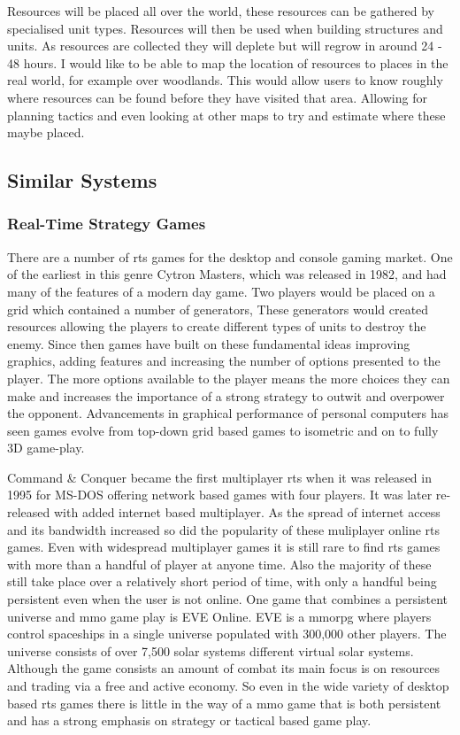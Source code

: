 \documentclass[11pt,fleqn,twoside]{article}
\begin{document}
Resources will be placed all over the world, these resources can be gathered by specialised unit types. Resources will then be used when building structures and units. As resources are collected they will deplete but will regrow in around 24 - 48 hours. I would like to be able to map the location of resources to places in the real world, for example over woodlands. This would allow users to know roughly where resources can be found before they have visited that area. Allowing for planning tactics and even looking at other maps to try and estimate where these maybe placed.

\subsection{Similar Systems}
\subsubsection{Real-Time Strategy Games}
There are a number of \gls{rts} games for the desktop and console gaming market. One of the earliest in this genre Cytron Masters, which was released in 1982, and had many of the features of a modern day game. Two players would be placed on a grid which contained a number of generators, These generators would created resources allowing the players to create different types of units to destroy the enemy. Since then games have built on these fundamental ideas improving graphics, adding features and increasing the number of options presented to the player. The more options available to the player means the more choices they can make and increases the importance of a strong strategy to outwit and overpower the opponent. Advancements in graphical performance of personal computers has seen games evolve from top-down grid based games to isometric and on to fully 3D game-play.

Command \& Conquer became the first multiplayer \gls{rts} when it was released in 1995 for MS-DOS offering network based games with four players. It was later re-released with added internet based multiplayer. As the spread of internet access and its  bandwidth increased so did the popularity of these muliplayer online \gls{rts} games. Even with widespread multiplayer games it is still rare to find \gls{rts} games with more than a handful of player at anyone time. Also the majority of these still take place over a relatively short period of time, with only a handful being persistent even when the user is not online. One game that combines a persistent universe and \gls{mmo} game play is EVE Online. EVE is a \gls{mmorpg} where players control spaceships in a single universe populated with 300,000 other players. The universe consists of over 7,500 solar systems different virtual solar systems. Although the game consists an amount of combat its main focus is on resources and trading via a free and active economy. So even in the wide variety of desktop based \gls{rts} games there is little in the way of a \gls{mmo} game that is both persistent and has a strong emphasis on strategy or tactical based game play.
\end{document}
